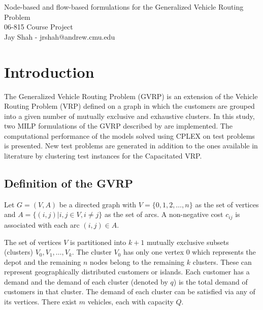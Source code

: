 \documentclass[letterpaper,12pt,onehalfspacing,twoside]{article}
\theoremstyle{msds}
\begin{document}
\pagestyle{plain}

\begingroup  
  \centering
  \LARGE Node-based and flow-based formulations for the Generalized Vehicle Routing Problem
  \\ \large 06-815 Course Project\\
  \large Jay Shah - jrshah@andrew.cmu.edu\par
\endgroup

\section{Introduction}
The Generalized Vehicle Routing Problem (GVRP) is an extension of the Vehicle Routing Problem (VRP) defined on a graph in which the customers are grouped into a given number of mutually exclusive and exhaustive clusters. In this study, two MILP formulations of the GVRP described by \cite{POP201297} are implemented. The computational performance of the models solved using CPLEX on test problems is presented. New test problems are generated in addition to the ones available in literature by clustering test instances for the Capacitated VRP.


\subsection{Definition of the GVRP}

Let $G = (V,A)$ be a directed graph with $V = \{0,1,2,\ldots,n\}$ as the set of vertices and $A = \{(i,j)|i , j \in V , i \ne j\}$ as the set of arcs. A non-negative cost $c_{ij}$ is associated with each arc $(i,j) \in A$.

The set of vertices $V$ is partitioned into $k + 1$ mutually exclusive subsets (clusters) $V_0, V_1, \ldots, V_k$. The cluster $V_0$ has only one vertex $0$ which represents the depot and the remaining $n$ nodes belong to the remaining $k$ clusters. These can represent geographically distributed customers or islands. Each customer has a demand and the demand of each cluster (denoted by $q$) is the total demand of customers in that cluster. The demand of each cluster can be satisfied via any of its vertices. There exist $m$ vehicles, each with capacity $Q$.
\end{document}

